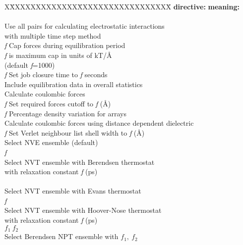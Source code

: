 \begin{tabbing}
X\=XXXXXXXXXXXXX\=XXXXXXXXXXXXXXXXXX\=\kill
\> {\bf directive:} \> {\bf meaning:} \\
\> ~ \> \\
 \> Use all pairs for calculating
electrostatic interactions\\
\>                 \> with multiple time step method\\
 {\em f}\> Cap forces during equilibration period\\
\>                 \> {\em f} is maximum cap in units of kT/\AA\\
\>                 \> (default {\em f}=1000)\\
 {\em f} \> Set job closure time to {\em f}
seconds\\
 \> Include equilibration data in overall statistics \\
 \> Calculate coulombic forces \\
  {\em f}  \> Set required forces cutoff to {\em f} (\AA)
\\
  {\em f}  \> Percentage density variation for arrays\\
 \> Calculate coulombic forces using distance dependent
dielectric\\
 {\em f} \> Set Verlet neighbour list shell width to {\em
f} (\AA) \\
 \> Select NVE ensemble (default) \\
 {\em f} \\
\> \> Select NVT ensemble with Berendsen thermostat\\
\> \> with relaxation constant {\em f} (ps) \\
 \\
\> \> Select NVT ensemble with Evans thermostat\\
 {\em f}\\
\> \> Select NVT ensemble with Hoover-Nose thermostat\\
\> \> with relaxation constant {\em f} (ps) \\
 $f_{1}~f_{2}$ \\
\> \>Select Berendsen NPT ensemble with $f_{1},~f_{2}$ \\

\end{tabbing}
